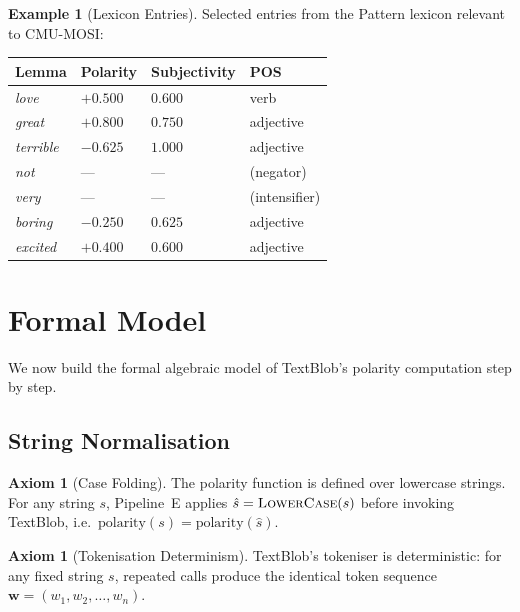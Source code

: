 \documentclass[12pt,a4paper]{article}
\theoremstyle{plain}
\theoremstyle{definition}
\newtheorem{axiom}[theorem]{Axiom}
\newtheorem{example}[theorem]{Example}
\begin{document}
\begin{example}[Lexicon Entries]
\label{ex:lexicon}
  Selected entries from the Pattern lexicon relevant to CMU-MOSI:
  \begin{center}
    \begin{tabular}{llll}
      \toprule
      Lemma & Polarity & Subjectivity & POS \\
      \midrule
      \textit{love}      & $+0.500$ & $0.600$ & verb \\
      \textit{great}     & $+0.800$ & $0.750$ & adjective \\
      \textit{terrible}  & $-0.625$ & $1.000$ & adjective \\
      \textit{not}       & ---      & ---     & (negator) \\
      \textit{very}      & ---      & ---     & (intensifier) \\
      \textit{boring}    & $-0.250$ & $0.625$ & adjective \\
      \textit{excited}   & $+0.400$ & $0.600$ & adjective \\
      \bottomrule
    \end{tabular}
  \end{center}
\end{example}

\section{Formal Model}
\label{sec:formal}

We now build the formal algebraic model of TextBlob's polarity
computation step by step.

\subsection{String Normalisation}

\begin{axiom}[Case Folding]
\label{ax:casefolding}
  The polarity function is defined over lowercase strings.  For any
  string $s$, Pipeline~E applies
  $\hat{s} = \textsc{LowerCase}(s)$
  before invoking TextBlob, i.e.\ $\text{polarity}(s) =
  \text{polarity}(\hat{s})$.
\end{axiom}

\begin{axiom}[Tokenisation Determinism]
\label{ax:tokendet}
  TextBlob's tokeniser is deterministic: for any fixed string $s$,
  repeated calls produce the identical token sequence
  $\mathbf{w} = (w_1, w_2, \ldots, w_n)$.
\end{axiom}
\end{document}
